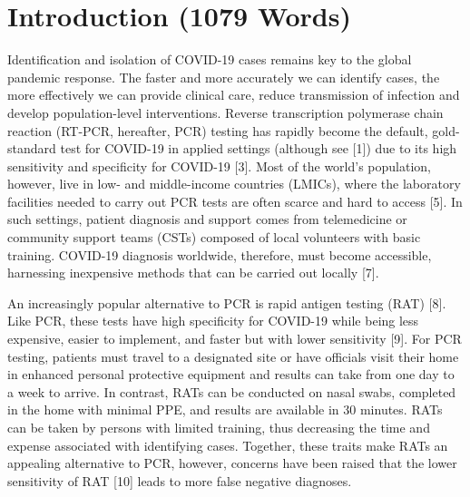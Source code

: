 \documentclass[]{elsarticle} %
\begin{document}
\hypertarget{introduction-1079-words}{%
\section{Introduction (1079 Words)}\label{introduction-1079-words}}

Identification and isolation of COVID-19 cases remains key to the global pandemic response.
The faster and more accurately we can identify cases, the more effectively we can provide clinical care, reduce transmission of infection and develop population-level interventions.
Reverse transcription polymerase chain reaction (RT-PCR, hereafter, PCR) testing has rapidly become the default, gold-standard test for COVID-19 in applied settings (although see {[}1{]}) due to its high sensitivity and specificity for COVID-19 {[}3{]}.
Most of the world's population, however, live in low- and middle-income countries (LMICs), where the laboratory facilities needed to carry out PCR tests are often scarce and hard to access {[}5{]}.
In such settings, patient diagnosis and support comes from telemedicine or community support teams (CSTs) composed of local volunteers with basic training.
COVID-19 diagnosis worldwide, therefore, must become accessible, harnessing inexpensive methods that can be carried out locally {[}7{]}.

An increasingly popular alternative to PCR is rapid antigen testing (RAT) {[}8{]}.
Like PCR, these tests have high specificity for COVID-19 while being less expensive, easier to implement, and faster but with lower sensitivity {[}9{]}.
For PCR testing, patients must travel to a designated site or have officials visit their home in enhanced personal protective equipment and results can take from one day to a week to arrive.
In contrast, RATs can be conducted on nasal swabs, completed in the home with minimal PPE, and results are available in 30 minutes.
RATs can be taken by persons with limited training, thus decreasing the time and expense associated with identifying cases.
Together, these traits make RATs an appealing alternative to PCR, however, concerns have been raised that the lower sensitivity of RAT {[}10{]} leads to more false negative diagnoses.
\end{document}
